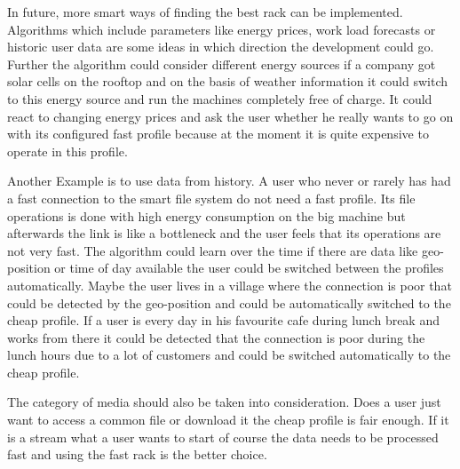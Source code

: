 \label{sec:outlook}
In future, more smart ways of finding the best rack can be implemented. Algorithms which include parameters like energy prices, work load forecasts or historic user data are some ideas in which direction the development could go. Further the algorithm could consider different energy sources if a company got solar cells on the rooftop and on the basis of weather information it could switch to this energy source and run the machines completely free of charge. It could react to changing energy prices and ask the user whether he really wants to go on with its configured fast profile because at the moment it is quite expensive to operate in this profile.

Another Example is to use data from history. A user who never or rarely has had a fast connection to the smart file system do not need a fast profile. Its file operations is done with high energy consumption on the big machine but afterwards the link is like a bottleneck and the user feels that its operations are not very fast. The algorithm could learn over the time if there are data like geo-position or time of day available the user could be switched between the profiles automatically. Maybe the user lives in a village where the connection is poor that could be detected by the geo-position and could be automatically switched to the cheap profile. If a user is every day in his favourite cafe during lunch break and works from there it could be detected that the connection is poor during the lunch hours due to a lot of customers and could be switched automatically to the cheap profile.

The category of media should also be taken into consideration. Does a user just want to access a common file or download it the cheap profile is fair enough. If it is a stream what a user wants to start of course the data needs to be processed fast and using the fast rack is the better choice.
